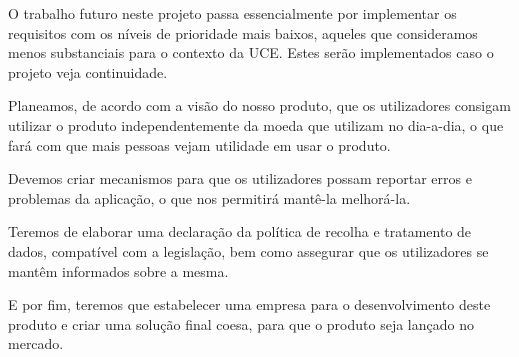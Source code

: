 \documentclass[12pt,a4paper]{article}
\begin{document}
    O trabalho futuro neste projeto passa essencialmente por implementar os requisitos com os níveis de prioridade mais baixos, aqueles que consideramos menos substanciais para o contexto da UCE. Estes serão implementados caso o projeto veja continuidade.

    Planeamos, de acordo com a visão do nosso produto, que os utilizadores consigam utilizar o produto independentemente da moeda que utilizam no dia-a-dia, o que fará com que mais pessoas vejam utilidade em usar o produto.

    Devemos criar mecanismos para que os utilizadores possam reportar erros e problemas da aplicação, o que nos permitirá mantê-la melhorá-la.

    Teremos de elaborar uma declaração da política de recolha e tratamento de dados, compatível com a legislação, bem como assegurar que os utilizadores se mantêm informados sobre a mesma.

    E por fim, teremos que estabelecer uma empresa para o desenvolvimento deste produto e criar uma solução final coesa, para que o produto seja lançado no mercado.

    \nocite{*}
    {}
    
\end{document}
